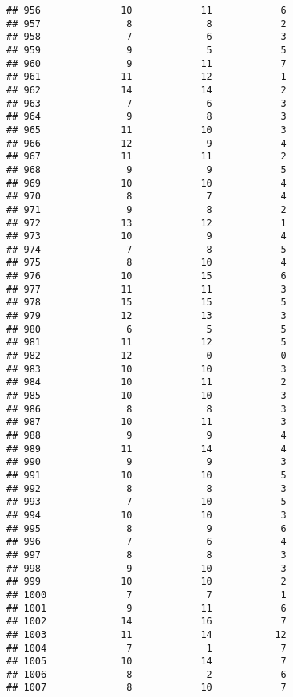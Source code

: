 \documentclass[
]{article}
\begin{document}
\begin{verbatim}
## 956              10            11            6
## 957               8             8            2
## 958               7             6            3
## 959               9             5            5
## 960               9            11            7
## 961              11            12            1
## 962              14            14            2
## 963               7             6            3
## 964               9             8            3
## 965              11            10            3
## 966              12             9            4
## 967              11            11            2
## 968               9             9            5
## 969              10            10            4
## 970               8             7            4
## 971               9             8            2
## 972              13            12            1
## 973              10             9            4
## 974               7             8            5
## 975               8            10            4
## 976              10            15            6
## 977              11            11            3
## 978              15            15            5
## 979              12            13            3
## 980               6             5            5
## 981              11            12            5
## 982              12             0            0
## 983              10            10            3
## 984              10            11            2
## 985              10            10            3
## 986               8             8            3
## 987              10            11            3
## 988               9             9            4
## 989              11            14            4
## 990               9             9            3
## 991              10            10            5
## 992               8             8            3
## 993               7            10            5
## 994              10            10            3
## 995               8             9            6
## 996               7             6            4
## 997               8             8            3
## 998               9            10            3
## 999              10            10            2
## 1000              7             7            1
## 1001              9            11            6
## 1002             14            16            7
## 1003             11            14           12
## 1004              7             1            7
## 1005             10            14            7
## 1006              8             2            6
## 1007              8            10            7

\end{verbatim}
\end{document}
